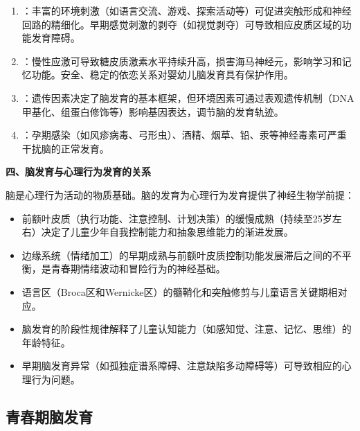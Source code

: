 \begin{keybox}
\begin{enumerate}[leftmargin=*]
    \item {}：丰富的环境刺激（如语言交流、游戏、探索活动等）可促进突触形成和神经回路的精细化。早期感觉刺激的剥夺（如视觉剥夺）可导致相应皮质区域的功能发育障碍。

    \item {}：慢性应激可导致糖皮质激素水平持续升高，损害海马神经元，影响学习和记忆功能。安全、稳定的依恋关系对婴幼儿脑发育具有保护作用。

    \item {}：遗传因素决定了脑发育的基本框架，但环境因素可通过表观遗传机制（DNA甲基化、组蛋白修饰等）影响基因表达，调节脑的发育轨迹。

    \item {}：孕期感染（如风疹病毒、弓形虫）、酒精、烟草、铅、汞等神经毒素可严重干扰脑的正常发育。
\end{enumerate}

\textbf{四、脑发育与心理行为发育的关系}

脑是心理行为活动的物质基础。脑的发育为心理行为发育提供了神经生物学前提：

\begin{itemize}[leftmargin=*]
    \item 前额叶皮质（执行功能、注意控制、计划决策）的缓慢成熟（持续至25岁左右）决定了儿童少年自我控制能力和抽象思维能力的渐进发展。
    \item 边缘系统（情绪加工）的早期成熟与前额叶皮质控制功能发展滞后之间的不平衡，是青春期情绪波动和冒险行为的神经基础。
    \item 语言区（Broca区和Wernicke区）的髓鞘化和突触修剪与儿童语言关键期相对应。
    \item 脑发育的阶段性规律解释了儿童认知能力（如感知觉、注意、记忆、思维）的年龄特征。
    \item 早期脑发育异常（如孤独症谱系障碍、注意缺陷多动障碍等）可导致相应的心理行为问题。
\end{itemize}
\end{keybox}

\subsection{青春期脑发育}

